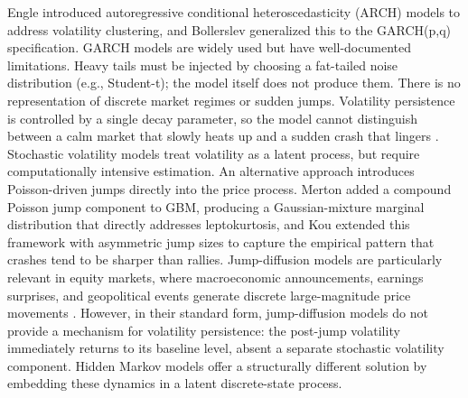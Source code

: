 Engle \cite{engle_1982} introduced autoregressive conditional heteroscedasticity (ARCH) models to address volatility clustering, and Bollerslev \cite{bollerslev_garch_1986} generalized this to the GARCH(p,q) specification. GARCH models are widely used but have well-documented limitations. Heavy tails must be injected by choosing a fat-tailed noise distribution (e.g., Student-t); the model itself does not produce them. There is no representation of discrete market regimes or sudden jumps. Volatility persistence is controlled by a single decay parameter, so the model cannot distinguish between a calm market that slowly heats up and a sudden crash that lingers \cite{diebold_inoue_2001}. Stochastic volatility models \cite{stein_stock_1991, heston_stochastic_1993} treat volatility as a latent process, but require computationally intensive estimation. An alternative approach introduces Poisson-driven jumps directly into the price process. Merton \cite{merton_jump_1976} added a compound Poisson jump component to GBM, producing a Gaussian-mixture marginal distribution that directly addresses leptokurtosis, and Kou \cite{kou_jump-diffusion_2002} extended this framework with asymmetric jump sizes to capture the empirical pattern that crashes tend to be sharper than rallies. Jump-diffusion models are particularly relevant in equity markets, where macroeconomic announcements, earnings surprises, and geopolitical events generate discrete large-magnitude price movements \cite{au_yeung_jump_2020}. However, in their standard form, jump-diffusion models do not provide a mechanism for volatility persistence: the post-jump volatility immediately returns to its baseline level, absent a separate stochastic volatility component. Hidden Markov models offer a structurally different solution by embedding these dynamics in a latent discrete-state process.

